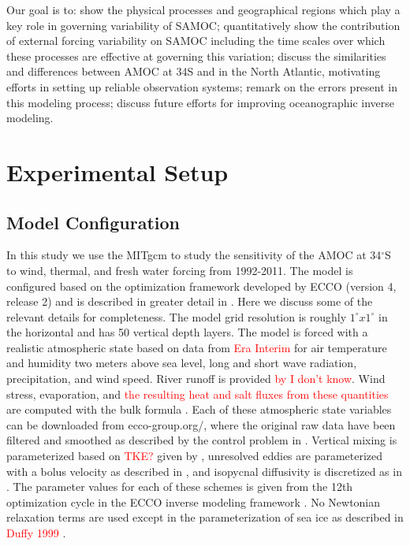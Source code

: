 \documentclass[a4paper,11pt]{article}
\newcommand{\red}[1]{\textcolor{red}{#1}}
\begin{document}

	Our goal is to: show the physical processes and geographical regions which play a key role in governing variability of SAMOC; quantitatively show the contribution of external forcing variability on SAMOC including the time scales over which these processes are effective at governing this variation; discuss the similarities and differences between AMOC at 34S and in the North Atlantic, motivating efforts in setting up reliable observation systems; remark on the errors present in this modeling process; discuss future efforts for improving oceanographic inverse modeling.

\section{Experimental Setup}
\label{theModel}
  \subsection{Model Configuration}

	In this study we use the MITgcm to study the sensitivity of the AMOC at 34$^{\circ}$S to wind, thermal, and fresh water forcing from 1992-2011. The model is configured based on the optimization framework developed by ECCO (version 4, release 2) and is described in greater detail in \cite{forgetECCOv4}. Here we discuss some of the relevant details for completeness. The model grid resolution is roughly $1^{\circ} x 1^{\circ}$ in the horizontal and has 50 vertical depth layers. The model is forced with a realistic atmospheric state based on data from \red{Era Interim} for air temperature and humidity two meters above sea level, long and short wave radiation, precipitation, and wind speed. River runoff is provided \red{by I don't know}. Wind stress, evaporation, and \red{the resulting heat and salt fluxes from these quantities} are computed with the bulk formula \cite{large2004}. Each of these atmospheric state variables can be downloaded from ecco-group.org/, where the original raw data have been filtered and smoothed as described by the control problem in \cite{forgetECCOv4}. Vertical mixing is parameterized based on \red{TKE?} given by \cite{ggl90}, unresolved eddies are parameterized with a bolus velocity as described in \cite{gm1990}, and isopycnal diffusivity is discretized as in \cite{redi1982}. The parameter values for each of these schemes is given from the 12th optimization cycle in the ECCO inverse modeling framework \cite{forgetECCOv4} \cite{forgetTurbulent}. No Newtonian relaxation terms are used except in the parameterization of sea ice as described in \red{Duffy 1999} \cite{nguyenSubgrid}. 
\end{document}
